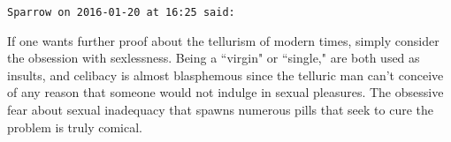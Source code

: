 \begin{footnotesize}\begin{sffamily}



\texttt{Sparrow on 2016-01-20 at 16:25 said: }

If one wants further proof about the tellurism of modern times, simply consider the obsession with sexlessness. Being a ``virgin" or ``single," are both used as insults, and celibacy is almost blasphemous since the telluric man can't conceive of any reason that someone would not indulge in sexual pleasures. The obsessive fear about sexual inadequacy that spawns numerous pills that seek to cure the problem is truly comical.


\end{sffamily}\end{footnotesize}
